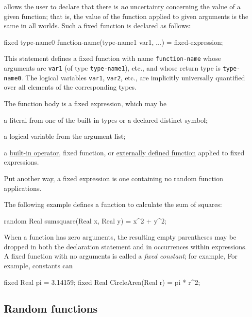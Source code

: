 \documentclass[12pt]{article}
\begin{document}
\bl allows the user to declare that there is {\em no} uncertainty concerning the value of a given function; that is, the
value of the function applied to given arguments is the same in all worlds. Such a fixed function is declared as follows:
\begin{blogcode}
fixed type-name0 function-name(type-name1 var1, ...) = fixed-expression;
\end{blogcode}
This statement defines a fixed function with name \texttt{function-name} whose arguments are {\tt var1} (of type {\tt type-name1}), etc.,
and whose return type is \texttt{type-name0}. The logical variables {\tt var1}, {\tt var2}, etc., are implicitly universally quantified over
all elements of the corresponding types.

The function body is a fixed expression, which may be
\begin{itemize*}
\item a literal from one of the built-in types or a declared distinct symbol;
\item a logical variable from the argument list;
\item a \hyperref[builtin-operator-appendix]{built-in operator}, fixed function, or \hyperref[external-function-appendix]{externally defined function} applied to fixed expressions.
\end{itemize*}
Put another way, a fixed expression is one containing no random function applications.

The following example defines a function to calculate the sum of squares:
\begin{blogcode}
random Real sumsquare(Real x, Real y) = x^2 + y^2;
\end{blogcode}

When a function has zero arguments, the resulting empty parentheses may be dropped
in both the declaration statement and in occurrences within expressions.
A fixed function with no arguments is called a \emph{fixed constant}; for example,
For example, constants can 
\begin{blogcode}
fixed Real pi = 3.14159;
fixed Real CircleArea(Real r) = pi * r^2;
\end{blogcode}



\subsection{Random functions}\label{random-function-section}
\end{document}

